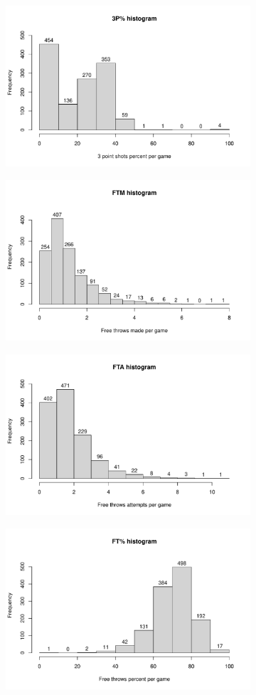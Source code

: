 \begin{figure}[H]
\begin{subfigure}{.3\textwidth}
		\caption{}
		\label{fig:HistX3PA}
	\end{subfigure}%
	\begin{subfigure}{.3\textwidth}
		\centering
		\includegraphics[width=0.5\linewidth]{ImageFiles/Histograms/histogram_x3p.pdf}
		\caption{}
		\label{fig:HistX3P}
	\end{subfigure}
	\begin{subfigure}{.3\textwidth}
		\centering
		\includegraphics[width=0.5\linewidth]{ImageFiles/Histograms/histogram_ftm.pdf}
		\caption{}
		\label{fig:HistFTM}
	\end{subfigure}%
	\begin{subfigure}{.3\textwidth}
		\centering
		\includegraphics[width=0.5\linewidth]{ImageFiles/Histograms/histogram_fta.pdf}
		\caption{}
		\label{fig:HistFTA}
	\end{subfigure}%
	\begin{subfigure}{.3\textwidth}
		\centering
		\includegraphics[width=0.5\linewidth]{ImageFiles/Histograms/histogram_ft.pdf}

\end{subfigure}
\end{figure}
